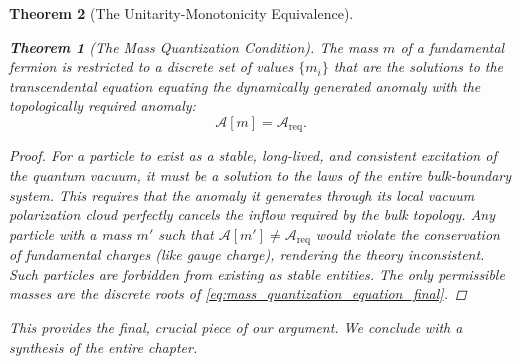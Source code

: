 \documentclass[11pt, letterpaper]{report}
\theoremstyle{plain} %
\newtheorem{theorem}{Theorem}[chapter]
\theoremstyle{definition} %
\theoremstyle{remark} %
\begin{document}
\begin{theorem}[The Unitarity-Monotonicity Equivalence]
\begin{theorem}[The Mass Quantization Condition]
\label{thm:mass_quantization_equation_final}
The mass $m$ of a fundamental fermion is restricted to a discrete set of values $\{m_i\}$ that are the solutions to the transcendental equation equating the dynamically generated anomaly with the topologically required anomaly:
\begin{equation}
    \mathcal{A}[m] = \mathcal{A}_{\text{req}}.
    \label{eq:mass_quantization_equation_final}
\end{equation}
\end{theorem}
\begin{proof}
For a particle to exist as a stable, long-lived, and consistent excitation of the quantum vacuum, it must be a solution to the laws of the entire bulk-boundary system. This requires that the anomaly it generates through its local vacuum polarization cloud perfectly cancels the inflow required by the bulk topology. Any particle with a mass $m'$ such that $\mathcal{A}[m'] \neq \mathcal{A}_{\text{req}}$ would violate the conservation of fundamental charges (like gauge charge), rendering the theory inconsistent. Such particles are forbidden from existing as stable entities. The only permissible masses are the discrete roots of \cref{eq:mass_quantization_equation_final}.
\end{proof}

This provides the final, crucial piece of our argument. We conclude with a synthesis of the entire chapter.


\end{theorem}
\end{document}
